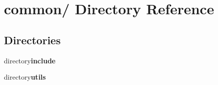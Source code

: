 \section{common/ Directory Reference}
\label{dir_000000}
\subsection*{Directories}
\begin{CompactItemize}
\item 
directory{\bf include}
\item 
directory{\bf utils}
\end{CompactItemize}

